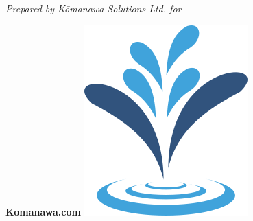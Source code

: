 \begin{titlepage}
\begin{center}
\begin{tcolorbox}[colback=kslvlblue,colframe=ksldarkblue,
            width=0.90\textwidth, valign=center]
            \huge\textbf{\reporttitle{}}

            \normalsize
            \begin{addmargin}[1em]{2em}
                \textit{\normalsize\reportenddate{}}

                \textit{Prepared by Kōmanawa Solutions Ltd. for \client{}}
            \end{addmargin}
        \end{tcolorbox}


        \vfill

        \begin{center}
            \begin{tcolorbox}[colback=black!80!white,colframe=black!80!white,
                valign=center]
                \color{white!95!brown}
                \huge \textbf{Komanawa.com} \hfill
                \includegraphics[width=.10\textwidth]{figures/template_figs/just_symbol}

            \end{tcolorbox}
        \end{center}

    \end{center}
\end{titlepage}